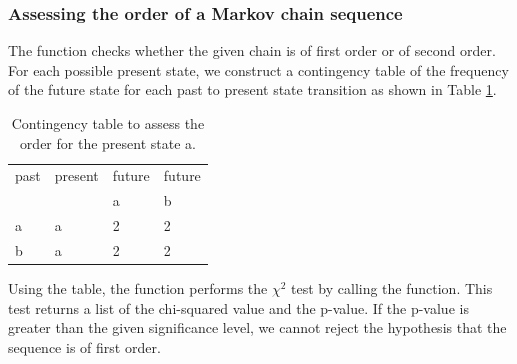 \documentclass[nojss]{jss}
\begin{document}
\begin{Schunk}
\end{Schunk}

\subsubsection{Assessing the order of a Markov chain sequence}
The  function checks whether the given chain is of first order or of second order.
For each possible present state, we construct a contingency table of the frequency of the future state for each past to present state transition as shown in Table \ref{tab:order}.

\begin{table}[h]
  \centering
  \begin{tabular}{l | l | l | l}
    \hline
  past & present & future & future \\
   &  & a & b \\
    \hline  \hline
  a & a & 2 & 2\\
  b & a & 2 & 2\\
  \hline
\end{tabular}
\caption{Contingency table to assess the order for the present state a.}
\label{tab:order}
\end{table} 

Using the table, the function performs the $\chi ^2$ test by calling the  function.
This test returns a list of the chi-squared value and the p-value. If the p-value is greater than the given significance level, we cannot reject the hypothesis that the sequence is of first order. 
\end{document}
